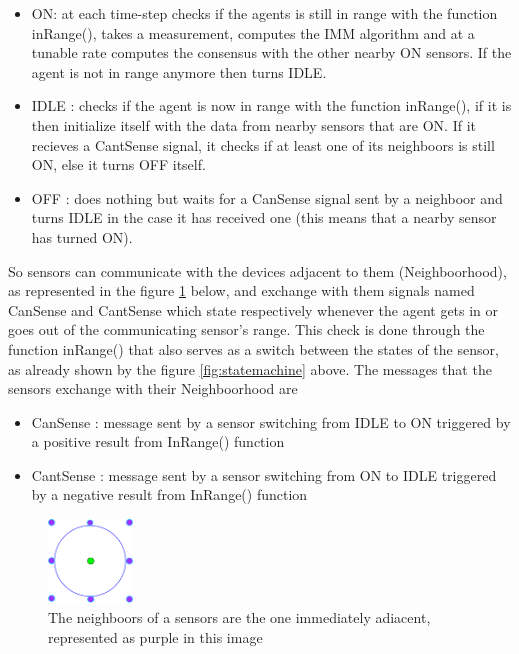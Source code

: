 \documentclass[twocolumn]{article}
\begin{document}
\begin{itemize}
    \item ON: at each time-step checks if the agents is still in range with the function inRange(), takes a measurement, computes the IMM algorithm and
          at a tunable rate computes the consensus with the other nearby ON sensors. If the agent is not in range anymore then turns IDLE.
    \item IDLE : checks if the agent is now in range with the function inRange(), if it is then initialize itself with the data from nearby sensors
          that are ON. If it recieves a CantSense signal, it checks if at least one of its neighboors is still ON, else it turns OFF itself.
    \item OFF : does nothing but waits for a CanSense signal sent by a neighboor and turns IDLE in the case it has received one (this means that
          a nearby sensor has turned ON).
\end{itemize}
So sensors can communicate with the devices adjacent to them (Neighboorhood), as represented in the figure \ref{fig:neighboors} below,
and exchange with them signals named CanSense and CantSense which state respectively whenever the agent gets in or goes out of the
communicating sensor's range. This check is done through the function inRange() that also serves as a switch between the states of the
sensor, as already shown by the figure \ref{fig:statemachine} above.
The messages that the sensors exchange with their Neighboorhood are
\begin{itemize}
    \item CanSense : message sent by a sensor switching from IDLE to ON triggered by a positive result from InRange() function
    \item CantSense : message sent by a sensor switching from ON to IDLE triggered by a negative result from InRange() function
\end{itemize}
\begin{figure}[h!]
    \centering
    \includegraphics[width=0.2\textwidth]{Immagini/2sensor.png}
    \caption{The neighboors of a sensors are the one immediately adiacent, represented as purple in this image}
    \label{fig:neighboors}
\end{figure}
\end{document}
